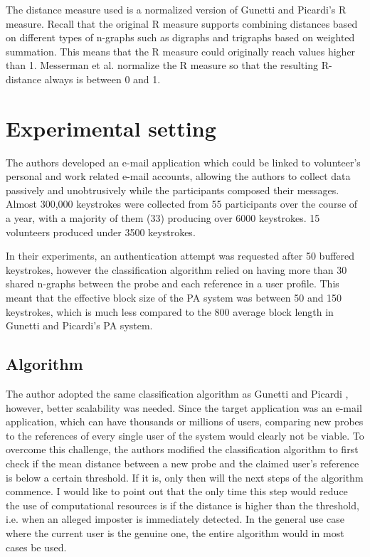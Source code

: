 \documentclass[informationsecurity]{gucmasterproject}
\begin{document}
The distance measure used is a normalized version of Gunetti and Picardi's R measure.
Recall that the original R measure supports combining distances based on different types of n-graphs such as digraphs and trigraphs based on weighted summation.
This means that the R measure could originally reach values higher than 1.
Messerman et al. \cite{Messerman} normalize the R measure so that the resulting R-distance always is between 0 and 1.

\section{Experimental setting}
\label{sec:messerman-experimental}
The authors developed an e-mail application which could be linked to volunteer's personal and work related e-mail accounts, allowing the authors to collect data passively and unobtrusively while the participants composed their messages.
Almost 300,000 keystrokes were collected from 55 participants over the course of a year, with a majority of them (33) producing over 6000 keystrokes.
15 volunteers produced under 3500 keystrokes.

In their experiments, an authentication attempt was requested after 50 buffered keystrokes, however the classification algorithm relied on having more than 30 shared n-graphs between the probe and each reference in a user profile. This meant that the effective block size of the PA system was between 50 and 150 keystrokes, which is much less compared to the 800 average block length in Gunetti and Picardi's \cite{gnp} PA system.

\subsection{Algorithm}
The author adopted the same classification algorithm as Gunetti and Picardi \cite{gnp}, however, better scalability was needed.
Since the target application was an e-mail application, which can have thousands or millions of users, comparing new probes to the references of every single user of the system would clearly not be viable.
To overcome this challenge, the authors modified the classification algorithm to first check if the mean distance between a new probe and the claimed user's reference is below a certain threshold.
If it is, only then will the next steps of the algorithm commence.
I would like to point out that the only time this step would reduce the use of computational resources is if the distance is higher than the threshold, i.e. when an alleged imposter is immediately detected.
In the general use case where the current user is the genuine one, the entire algorithm would in most cases be used.
\end{document}
